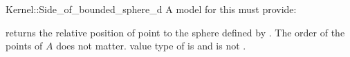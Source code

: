 \begin{ccRefFunctionObjectConcept}{Kernel::Side_of_bounded_sphere_d}
A model for this must provide:


{returns the relative position of point  to the sphere
  defined by \ccc{A = tuple [first,last)}. The order of the points of
  $A$ does not matter.  
  \ccPrecond value type of  is  and
   is not .}

\end{ccRefFunctionObjectConcept}
